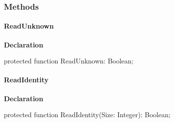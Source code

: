 \documentclass{report}
\newif\ifpdf
\begin{document}
\subsubsection*{\large{\textbf{Methods}}\normalsize\hspace{1ex}\hfill}
\paragraph*{ReadUnknown}\hspace*{\fill}

\label{httpsend.THTTPSend-ReadUnknown}
\begin{list}{}{
\setlength{\itemindent}{0cm}
\setlength{\listparindent}{0cm}
\setlength{\leftmargin}{\evensidemargin}
\addtolength{\leftmargin}{\tmplength}
\settowidth{\labelsep}{X}
\addtolength{\leftmargin}{\labelsep}
\setlength{\labelwidth}{\tmplength}
}
\item[\textbf{Declaration}\hfill]
\ifpdf
\begin{flushleft}
\fi
\begin{ttfamily}
protected function ReadUnknown: Boolean;\end{ttfamily}

\ifpdf
\end{flushleft}
\fi

\end{list}
\paragraph*{ReadIdentity}\hspace*{\fill}

\label{httpsend.THTTPSend-ReadIdentity}
\begin{list}{}{
\setlength{\itemindent}{0cm}
\setlength{\listparindent}{0cm}
\setlength{\leftmargin}{\evensidemargin}
\addtolength{\leftmargin}{\tmplength}
\settowidth{\labelsep}{X}
\addtolength{\leftmargin}{\labelsep}
\setlength{\labelwidth}{\tmplength}
}
\item[\textbf{Declaration}\hfill]
\ifpdf
\begin{flushleft}
\fi
\begin{ttfamily}
protected function ReadIdentity(Size: Integer): Boolean;\end{ttfamily}

\ifpdf
\end{flushleft}
\fi

\end{list}
\end{document}
